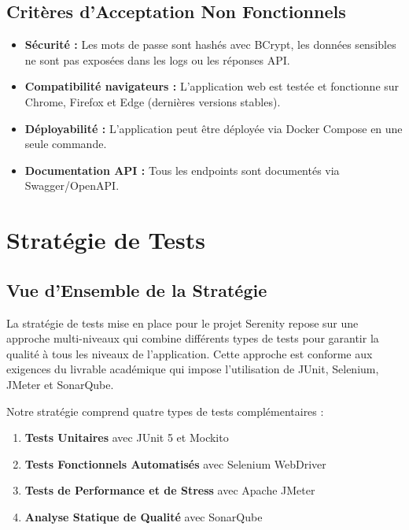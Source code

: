 \documentclass[12pt,a4paper]{report}
\begin{document}
\section{Critères d'Acceptation Non Fonctionnels}

\begin{itemize}
    \item \textbf{Sécurité :} Les mots de passe sont hashés avec BCrypt, les données sensibles ne sont pas exposées dans les logs ou les réponses API.
    
    \item \textbf{Compatibilité navigateurs :} L'application web est testée et fonctionne sur Chrome, Firefox et Edge (dernières versions stables).
    
    \item \textbf{Déployabilité :} L'application peut être déployée via Docker Compose en une seule commande.
    
    \item \textbf{Documentation API :} Tous les endpoints sont documentés via Swagger/OpenAPI.
\end{itemize}

\newpage

\chapter{Stratégie de Tests}

\section{Vue d'Ensemble de la Stratégie}

La stratégie de tests mise en place pour le projet Serenity repose sur une approche multi-niveaux qui combine différents types de tests pour garantir la qualité à tous les niveaux de l'application. Cette approche est conforme aux exigences du livrable académique qui impose l'utilisation de JUnit, Selenium, JMeter et SonarQube.

Notre stratégie comprend quatre types de tests complémentaires :
\begin{enumerate}
    \item \textbf{Tests Unitaires} avec JUnit 5 et Mockito
    \item \textbf{Tests Fonctionnels Automatisés} avec Selenium WebDriver
    \item \textbf{Tests de Performance et de Stress} avec Apache JMeter
    \item \textbf{Analyse Statique de Qualité} avec SonarQube
\end{enumerate}
\end{document}
